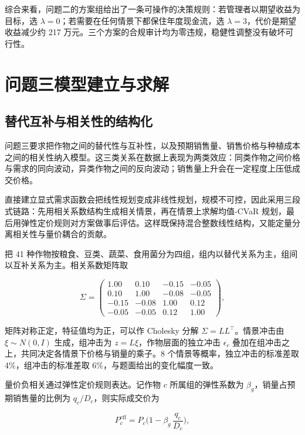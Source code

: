\documentclass[bwprint]{gmcmthesis}
\begin{document}
综合来看，问题二的方案组给出了一条可操作的决策规则：若管理者以期望收益为目标，选 $\lambda=0$；若需要在任何情景下都保住年度现金流，选 $\lambda=3$，代价是期望收益减少约 217 万元。三个方案的合规审计均为零违规，稳健性调整没有破坏可行性。

\section{问题三模型建立与求解}

\subsection{替代互补与相关性的结构化}

问题三要求把作物之间的替代性与互补性，以及预期销售量、销售价格与种植成本之间的相关性纳入模型。这三类关系在数据上表现为两类效应：同类作物之间价格与需求的同向波动，异类作物之间的反向波动；销售量上升会在一定程度上压低成交价格。

直接建立显式需求函数会把线性规划变成非线性规划，规模不可控，因此采用三段式链路：先用相关系数结构生成相关情景，再在情景上求解均值-CVaR 规划，最后用弹性定价规则对方案做事后评估。这样既保持混合整数线性结构，又能定量分离相关性与量价耦合的贡献。

把 41 种作物按粮食、豆类、蔬菜、食用菌分为四组，组内以替代关系为主，组间以互补关系为主。相关系数矩阵取

\begin{equation}
\Sigma=\begin{pmatrix}
1.00 & 0.10 & -0.15 & -0.05\\
0.10 & 1.00 & -0.08 & -0.05\\
-0.15 & -0.08 & 1.00 & 0.12\\
-0.05 & -0.05 & 0.12 & 1.00
\end{pmatrix},
\end{equation}

矩阵对称正定，特征值均为正，可以作 Cholesky 分解 $\Sigma=LL^{\top}$。情景冲击由 $\xi\sim N(0,I)$ 生成，组冲击为 $z=L\xi$，作物层面的独立冲击 $\epsilon_c$ 叠加在组冲击之上，共同决定各情景下价格与销量的乘子。8 个情景等概率，独立冲击的标准差取 4\%，组冲击的标准差取 6\%，与题面给出的变化幅度一致。

量价负相关通过弹性定价规则表达。记作物 $c$ 所属组的弹性系数为 $\beta_g$，销量占预期销售量的比例为 $q_c/D_c$，则实际成交价为

\begin{equation}
P_c^{\text{eff}}=P_c\Big(1-\beta_g\,\frac{q_c}{D_c}\Big),
\end{equation}
\end{document}

